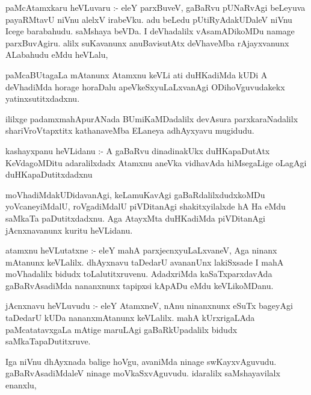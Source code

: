 \documentclass{article}
\begin{document}
\begin{mn}
paMcAtamxkaru heVLuvaru :- eleY parxBuveV, gaBaRvu pUNaRvAgi beLeyuva payaRMtavU
niVnu alelxV irabeVku. adu beLedu pUtiRyAdakUDaleV niVnu Icege barabahudu. 
 saMshaya beVDa. I deVhadalilx vAsamADikoMDu namage parxBuvAgiru.  alilx 
 suKavanunx anuBavisutAtx deVhaveMba rAjayxvanunx ALabahudu eMdu heVLalu,
\end{mn}

\begin{mn}
paMcaBUtagaLa mAtanunx Atamxnu keVLi ati duHKadiMda kUDi A deVhadiMda horage
 horaDalu apeVkeSxyuLaLxvanAgi ODihoVguvudakekx yatinxsutitxdadxnu.
\end{mn}

\begin{mn}
ililxge padamxmahApurANada BUmiKaMDadalilx devAsura parxkaraNadalilx 
shariVroVtapxtitx kathanaveMba  ELaneya adhAyxyavu mugidudu.
\end{mn}




\begin{mn}
kashayxpanu heVLidanu :-  A gaBaRvu dinadinakUkx duHKapaDutAtx KeVdagoMDitu 
 adaralilxdadx Atamxnu aneVka vidhavAda hiMsegaLige oLagAgi duHKapaDutitxdadxnu 
 \end{mn}

\begin{mn}
moVhadiMdakUDidavanAgi, keLamuKavAgi gaBaRdalilxdudxkoMDu yoVcaneyiMdalU,
roVgadiMdalU piVDitanAgi shakitxyilalxde hA Ha eMdu saMkaTa paDutitxdadxnu. 
 Aga AtayxMta duHKadiMda piVDitanAgi jAcnxnavanunx kuritu heVLidanu.
\end{mn}

\begin{mn}
atamxnu heVLutatxne :- eleY mahA parxjecnxyuLaLxvaneV, Aga ninanx mAtanunx 
keVLalilx. dhAyxnavu taDedarU avananUnx  lakiSxsade I mahA moVhadalilx bidudx
toLalutitxruvenu.  AdadxriMda kaSaTxparxdavAda gaBaRvAsadiMda nananxnunx
 tapipxsi kApADu eMdu keVLikoMDanu.
\end{mn}

\begin{mn}
jAcnxnavu heVLuvudu :- eleY AtamxneV, nAnu ninanxnunx eSuTx bageyAgi taDedarU
kUDa nananxmAtanunx keVLalilx.  mahA kUrxrigaLAda paMcatatavxgaLa mAtige
maruLAgi gaBaRkUpadalilx bidudx saMkaTapaDutitxruve.
\end{mn}

\begin{mn}
Iga niVnu dhAyxnada balige hoVgu, avaniMda ninage swKayxvAguvudu.  
gaBaRvAsadiMdaleV ninage moVkaSxvAguvudu. idaralilx saMshayavilalx enanxlu,
\end{mn}
\end{document}
